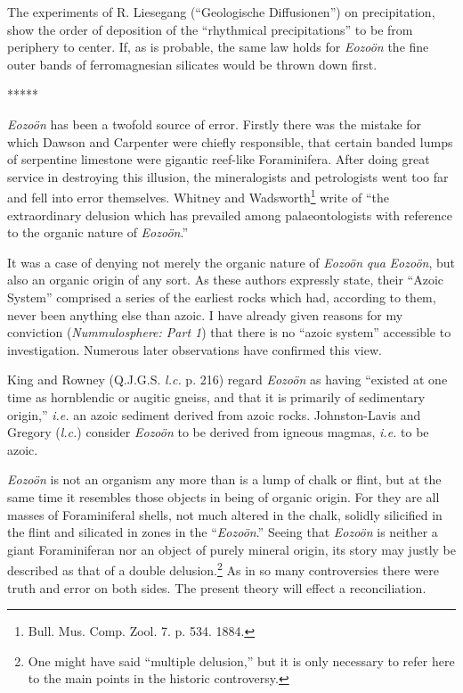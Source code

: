 \documentclass[a4paper, 12pt, oneside]{article}
\begin{document}
The experiments of R. Liesegang (``Geologische Diffusionen'') on precipitation, show the order of deposition of the ``rhythmical precipitations'' to be from periphery to center. If, as is probable, the same law holds for \emph{Eozoön} the fine outer bands of ferromagnesian silicates would be thrown down first. 

\centerline{*\hspace{15mm}*\hspace{15mm}*\hspace{15mm}*\hspace{15mm}*}
\bigskip

\emph{Eozoön} has been a twofold source of error. Firstly there was the mistake for which Dawson and Carpenter were chiefly responsible, that certain banded lumps of serpentine limestone were gigantic reef-like Foraminifera. After doing great service in destroying this illusion, the mineralogists and petrologists went too far and fell into error themselves. Whitney and Wadsworth\footnote{Bull. Mus. Comp. Zool. 7. p. 534. 1884.} write of ``the extraordinary delusion which has prevailed among palaeontologists with reference to the organic nature of \emph{Eozoön}.''

It was a case of denying not merely the organic nature of \emph{Eozoön} \emph{qua} \emph{Eozoön}, but also an organic origin of any sort. As these authors expressly state, their ``Azoic System'' comprised a series of the earliest rocks which had, according to them, never been anything else than azoic. I have already given reasons for my conviction (\emph{Nummulosphere: Part 1}) that there is no ``azoic system'' accessible to investigation. Numerous later observations have confirmed this view.

King and Rowney (Q.J.G.S. \emph{l.c.} p. 216) regard \emph{Eozoön} as having ``existed at one time as hornblendic or augitic gneiss, and that it is primarily of sedimentary origin,'' \emph{i.e.} an azoic sediment derived from azoic rocks. Johnston-Lavis and Gregory (\emph{l.c.}) consider \emph{Eozoön} to be derived from igneous magmas, \emph{i.e.} to be azoic.

\emph{Eozoön} is not an organism any more than is a lump of chalk or flint, but at the same time it resembles those objects in being of organic origin. For they are all masses of Foraminiferal shells, not much altered in the chalk, solidly silicified in the flint and silicated in zones in the ``\emph{Eozoön}.'' Seeing that \emph{Eozoön} is neither a giant Foraminiferan nor an object of purely mineral origin, its story may justly be described as that of a double delusion.\footnote{One might have said ``multiple delusion,'' but it is only necessary to refer here to the main points in the historic controversy.} As in so many controversies there were truth and error on both sides. The present theory will effect a reconciliation.
\end{document}
